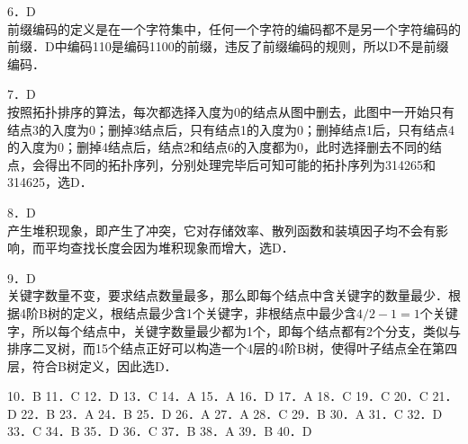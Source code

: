 6．D \\
前缀编码的定义是在一个字符集中，任何一个字符的编码都不是另一个字符编码的前缀．D中编码110是编码1100的前缀，违反了前缀编码的规则，所以D不是前缀编码．

7．D \\
按照拓扑排序的算法，每次都选择入度为0的结点从图中删去，此图中一开始只有结点3的入度为0；删掉3结点后，只有结点1的入度为0；删掉结点1后，只有结点4的入度为0；删掉4结点后，结点2和结点6的入度都为0，此时选择删去不同的结点，会得出不同的拓扑序列，分别处理完毕后可知可能的拓扑序列为314265和314625，选D．

8．D \\
产生堆积现象，即产生了冲突，它对存储效率、散列函数和装填因子均不会有影响，而平均查找长度会因为堆积现象而增大，选D．

9．D \\
关键字数量不变，要求结点数量最多，那么即每个结点中含关键字的数量最少．根据4阶B树的定义，根结点最少含1个关键字，非根结点中最少含$4/2-1=1$个关键字，所以每个结点中，关键字数量最少都为1个，即每个结点都有2个分支，类似与排序二叉树，而15个结点正好可以构造一个4层的4阶B树，使得叶子结点全在第四层，符合B树定义，因此选D．

10．B
11．C
12．D
13．C
14．A
15．A
16．D
17．A
18．C
19．C
20．C
21．D
22．B
23．A
24．B
25．D
26．A
27．A
28．C
29．B
30．A
31．C
32．D
33．C
34．B
35．D
36．C
37．B
38．A
39．B
40．D